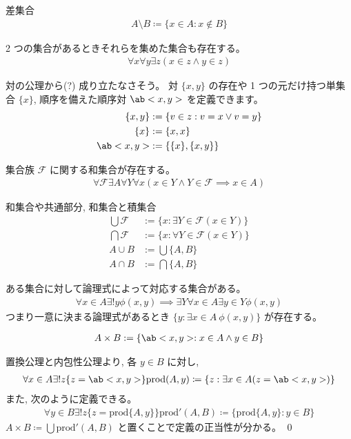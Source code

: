 \documentclass[uplatex,dvipdfmx,a4paper,11pt]{jlreq}
\makeatletter
\theoremstyle{definition}
\renewenvironment{proof}[1][\proofname]{\par
  \normalfont
  \topsep6\p@\@plus6\p@ \trivlist
  \item[\hskip\labelsep{\bfseries #1}\@addpunct{\bfseries}]\ignorespaces\quad\par
}{%
  \qed\endtrivlist\@endpefalse
}
\renewcommand\proofname{証明}
\makeatother
\begin{document}
差集合
\begin{align}
  A\setminus B\coloneq\{x\in A:x\notin B\}
\end{align}

\begin{axiom}[対の公理]
  2 つの集合があるときそれらを集めた集合も存在する。
  \begin{align}
    \forall x\forall y\exists z(x\in z\land y\in z)
  \end{align}
\end{axiom}
対の公理から(?) 成り立たなさそう。
対 $\{x, y\}$ の存在や 1 つの元だけ持つ単集合 $\{x\}$, 順序を備えた順序対 $\ab<x, y>$ を定義できます。
\begin{align}
  \{x, y\}  & := \{v\in z:v=x\lor v=y\} \\
  \{x\}     & := \{x, x\}               \\
  \ab<x, y> & := \{\{x\}, \{x,y\}\}
\end{align}
\begin{axiom}[和集合の公理]
  集合族 $\mathcal{F}$ に関する和集合が存在する。
  \begin{align}
    \forall\mathcal{F}\exists A\forall Y\forall x(x\in Y\land Y\in\mathcal{F}\implies x\in A)
  \end{align}
\end{axiom}
和集合や共通部分, 和集合と積集合
\begin{align}
  \bigcup\mathcal{F} & := \{x:\exists Y\in\mathcal{F}(x\in Y)\} \\
  \bigcap\mathcal{F} & := \{x:\forall Y\in\mathcal{F}(x\in Y)\} \\
  A\cup B            & := \bigcup\{A, B\}                       \\
  A\cap B            & := \bigcap\{A, B\}
\end{align}
\begin{axiom}[置換図式]
  ある集合に対して論理式によって対応する集合がある。
  \begin{align}
    \forall x\in A\exists!y\phi(x,y)\implies\exists Y\forall x\in A\exists y\in Y\phi(x,y)
  \end{align}
  つまり一意に決まる論理式があるとき $\{y:\exists x\in A\ \phi(x,y)\}$ が存在する。
\end{axiom}
\begin{theorem}[直積集合]
  \begin{align}
    A\times B := \{\ab<x,y>:x\in A\land y\in B\}
  \end{align}
\end{theorem}
\begin{proof}
  置換公理と内包性公理より, 各 $y\in B$ に対し,
  \begin{align}
    \forall x\in A\exists!z\{z=\ab<x,y>\}
    \mathrm{prod}(A,y) \coloneq \{z:\exists x\in A(z=\ab<x, y>)\}
  \end{align}
  また, 次のように定義できる。
  \begin{align}
    \forall y\in B\exists!z\{z=\mathrm{prod}\{A,y\}\}
    \mathrm{prod}'(A,B) \coloneq \{\mathrm{prod}\{A,y\}: y\in B\}
  \end{align}
  $A\times B\coloneq\bigcup\mathrm{prod}'(A, B)$ と置くことで定義の正当性が分かる。
\end{proof}
\end{document}
